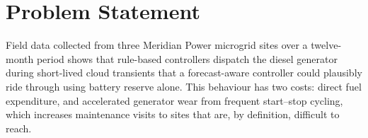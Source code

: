 \section{Problem Statement}
Field data collected from three Meridian Power microgrid sites over a twelve-month period shows
that rule-based controllers dispatch the diesel generator during short-lived cloud transients
that a forecast-aware controller could plausibly ride through using battery reserve alone. This
behaviour has two costs: direct fuel expenditure, and accelerated generator wear from frequent
start--stop cycling, which increases maintenance visits to sites that are, by definition,
difficult to reach.
